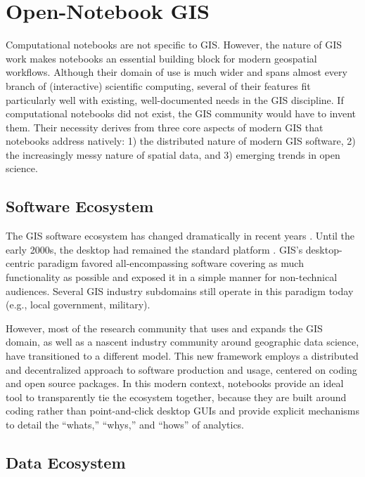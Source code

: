 \documentclass[11pt,letterpaper]{article}
\begin{document}
\section{Open-Notebook GIS}

Computational notebooks are not specific to GIS. However, the nature of GIS work makes notebooks an essential building block for modern geospatial workflows. Although their domain of use is much wider and spans almost every branch of (interactive) scientific computing, several of their features fit particularly well with existing, well-documented needs in the GIS discipline. If computational notebooks did not exist, the GIS community would have to invent them. Their necessity derives from three core aspects of modern GIS that notebooks address natively: 1) the distributed nature of modern GIS software, 2) the increasingly messy nature of spatial data, and 3) emerging trends in open science.

\subsection{Software Ecosystem}

The GIS software ecosystem has changed dramatically in recent years \citep{arribas-bel_geography_2018}. Until the early 2000s, the desktop had remained the standard platform \citep{gahegan_our_2018}. GIS's desktop-centric paradigm favored all-encompassing software covering as much functionality as possible and exposed it in a simple manner for non-technical audiences. Several GIS industry subdomains still operate in this paradigm today (e.g., local government, military).

However, most of the research community that uses and expands the GIS domain, as well as a nascent industry community around geographic data science, have transitioned to a different model. This new framework employs a distributed and decentralized approach to software production and usage, centered on coding and open source packages. In this modern context, notebooks provide an ideal tool to transparently tie the ecosystem together, because they are built around coding rather than point-and-click desktop GUIs and provide explicit mechanisms to detail the \enquote{whats,} \enquote{whys,} and \enquote{hows} of analytics.

\subsection{Data Ecosystem}
\end{document}

